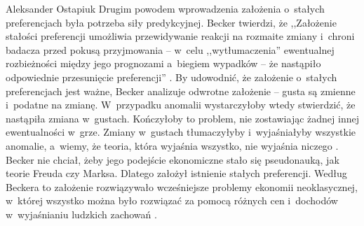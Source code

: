 \begin{artplenv}{Aleksander Ostapiuk}
Drugim powodem wprowadzenia założenia o~stałych preferencjach była potrzeba siły predykcyjnej. Becker twierdzi, że
,,Założenie stałości preferencji umożliwia przewidywanie reakcji na rozmaite zmiany i~chroni badacza przed pokusą
przyjmowania -- w~celu ,,wytłumaczenia'' ewentualnej rozbieżności między jego prognozami a~biegiem wypadków -- że
nastąpiło odpowiednie przesunięcie preferencji''
\parencite[s.~23]{becker_ekonomiczna_1990}.
By udowodnić, że
założenie o~stałych preferencjach jest ważne, Becker analizuje odwrotne założenie -- gusta są zmienne i~podatne na
zmianę. W~przypadku anomalii wystarczyłoby wtedy stwierdzić, że nastąpiła zmiana w~gustach. Kończyłoby to problem, nie
zostawiając żadnej innej ewentualności w~grze. Zmiany w~gustach tłumaczyłyby i~wyjaśniałyby wszystkie anomalie, a~wiemy,
że teoria, która wyjaśnia wszystko, nie wyjaśnia niczego
\parencite{popper_logic_1959}.
Becker nie chciał,
żeby jego podejście ekonomiczne stało się pseudonauką, jak teorie Freuda czy Marksa. Dlatego założył istnienie stałych
preferencji. Według Beckera to założenie rozwiązywało wcześniejsze problemy ekonomii neoklasycznej, w~której wszystko
można było rozwiązać za pomocą różnych cen i~dochodów w~wyjaśnianiu ludzkich zachowań
\parencite{becker_gustibus_1977}.


\end{artplenv}
